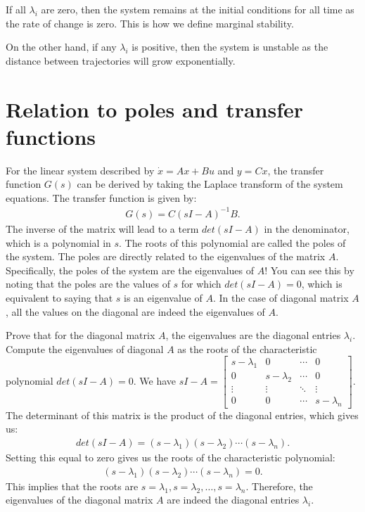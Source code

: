 \documentclass{ee122_notes}
\begin{document}
If all $\lambda_i$ are zero, then the system remains at the initial conditions for all time as the rate of change is zero. This is how we define marginal stability.

On the other hand, if any $\lambda_i$ is positive, then the system is unstable as the distance between trajectories will grow exponentially.

\section{Relation to poles and transfer functions}
For the linear system described by $\dot{x} = Ax + Bu$ and $y = Cx$, the transfer function $G(s)$ can be derived by taking the Laplace transform of the system equations. The transfer function is given by:
\begin{align*}
    G(s) = C(sI - A)^{-1}B.
\end{align*}
The inverse of the matrix will lead to a term $det(sI - A)$ in the denominator, which is a polynomial in $s$. The roots of this polynomial are called the poles of the system. The poles are directly related to the eigenvalues of the matrix $A$. Specifically, the poles of the system are the eigenvalues of $A$! You can see this by noting that the poles are the values of $s$ for which $det(sI - A) = 0$, which is equivalent to saying that $s$ is an eigenvalue of $A$. In the case of diagonal matrix $A$, all the values on the diagonal are indeed the eigenvalues of $A$.
\begin{popquiz}
Prove that for the diagonal matrix $A$, the eigenvalues are the diagonal entries $\lambda_i$.
\popqsplit
Compute the eigenvalues of diagonal $A$ as the roots of the characteristic polynomial $det(sI - A) = 0$.
We have $sI - A = \begin{bmatrix}
s - \lambda_1 & 0 & \cdots & 0 \\
0 & s - \lambda_2 & \cdots & 0 \\
\vdots & \vdots & \ddots & \vdots \\
0 & 0 & \cdots & s - \lambda_n
\end{bmatrix}$. The determinant of this matrix is the product of the diagonal entries, which gives us:
\begin{align*}
    det(sI - A) = (s - \lambda_1)(s - \lambda_2) \cdots (s - \lambda_n).
\end{align*}
Setting this equal to zero gives us the roots of the characteristic polynomial:
\begin{align*}
    (s - \lambda_1)(s - \lambda_2) \cdots (s - \lambda_n) = 0.
\end{align*}
This implies that the roots are $s = \lambda_1, s = \lambda_2, \ldots, s = \lambda_n$. Therefore, the eigenvalues of the diagonal matrix $A$ are indeed the diagonal entries $\lambda_i$.

\end{popquiz}
\end{document}
